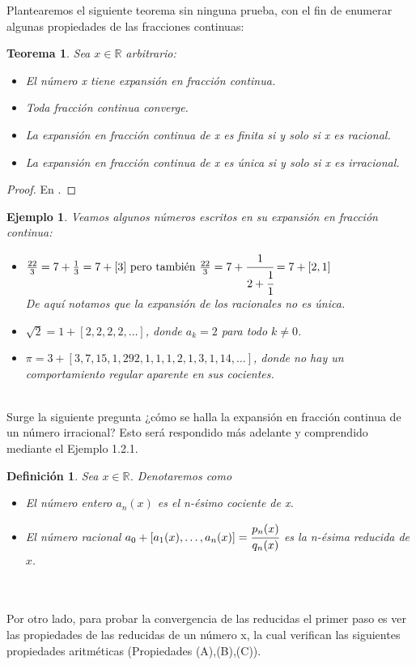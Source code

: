 \documentclass[12pt]{report}
\newtheorem{defi}{Definición}[section]
\newtheorem{teo}{Teorema}[section]
\newtheorem{ejem}{Ejemplo}[section]
\begin{document}
Plantearemos el siguiente teorema sin ninguna prueba, con el fin de enumerar algunas propiedades de las fracciones continuas:

\begin{teo}
Sea $x\in\mathbb{R}$ arbitrario:
\begin{itemize}
    \item[(a)] El número x tiene expansión en fracción continua.
    \item[(b)] Toda fracción continua converge.
    \item[(c)] La expansión en fracción continua de x es finita si y solo si x es racional.
    \item[(d)] La expansión en fracción continua de x es única si y solo si x es irracional.
\end{itemize}
\end{teo}
\begin{proof}
En \cite{Portugues}.
\end{proof}
\begin{ejem}
Veamos algunos números escritos en su expansión en fracción continua:
\begin{itemize}
    \item $\frac{22}{3}= 7 + \frac{1}{3} = 7+[3] \text{ pero también }\frac{22}{3}= 7 + \cfrac{1}{2 + \cfrac{1}{1}} = 7+[2,1]$
    \\
    
    De aquí notamos que la expansión de los racionales no es única.
    \item $\sqrt{2}=1+[2,2,2,2,\ldots]$, donde $a_{k}=2$ para todo $k\neq0$.
    \item $\pi=3+[3,7,15,1,292,1,1,1,2,1,3,1,14,\ldots]$, donde no hay un comportamiento regular aparente en sus cocientes.
\end{itemize}
\end{ejem}
\\
Surge la siguiente pregunta ¿cómo se halla la expansión en fracción continua de un número irracional? Esto será respondido más adelante y comprendido mediante el Ejemplo 1.2.1.

\begin{defi}
Sea $x\in\mathbb{R}$. Denotaremos como
\begin{itemize}
    \item El número entero $a_{n}(x)$ es el n-ésimo cociente de x.
    \item El número racional $a_{0} + [a_{1}(x), \ldots, a_{n}(x)]=\cfrac{p_{n}(x)}{q_{n}(x)}$ es la n-ésima reducida de $x$.
\end{itemize}
\end{defi}
\\
\\
Por otro lado, para probar la convergencia de las reducidas el primer paso es ver las propiedades de las reducidas de un número x, la cual verifican las siguientes propiedades aritméticas (Propiedades (A),(B),(C)).
\\
\end{document}

